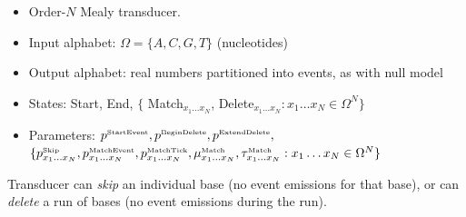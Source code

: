 \documentclass[10pt]{article}
\begin{document}
\begin{itemize}
\item Order-$N$ Mealy transducer.
\item Input alphabet: $\Omega = \{ A, C, G, T \}$ (nucleotides)
\item Output alphabet: real numbers partitioned into events, as with null model
\item States: Start, End, $\{$ Match${}_{x_1 \ldots x_N}$, Delete${}_{x_1 \ldots x_N}: x_1 \ldots x_N \in \Omega^N \}$
\item Parameters:
$p^{\mbox{\tiny StartEvent}}, p^{\mbox{\tiny BeginDelete}}, p^{\mbox{\tiny ExtendDelete}},$ \\
$\{ p^{\mbox{\tiny Skip}}_{x_1\ldots x_N}, p^{\mbox{\tiny MatchEvent}}_{x_1\ldots x_N}, p^{\mbox{\tiny MatchTick}}_{x_1\ldots x_N}, \mu^{\mbox{\tiny Match}}_{x_1\ldots x_N},\tau^{\mbox{\tiny Match}}_{x_1\ldots x_N} : x_1 \ldots x_N \in \Omega^N \}$
\end{itemize}

Transducer can {\em skip} an individual base (no event emissions for that base),
or can {\em delete} a run of bases (no event emissions during the run).
\end{document}

